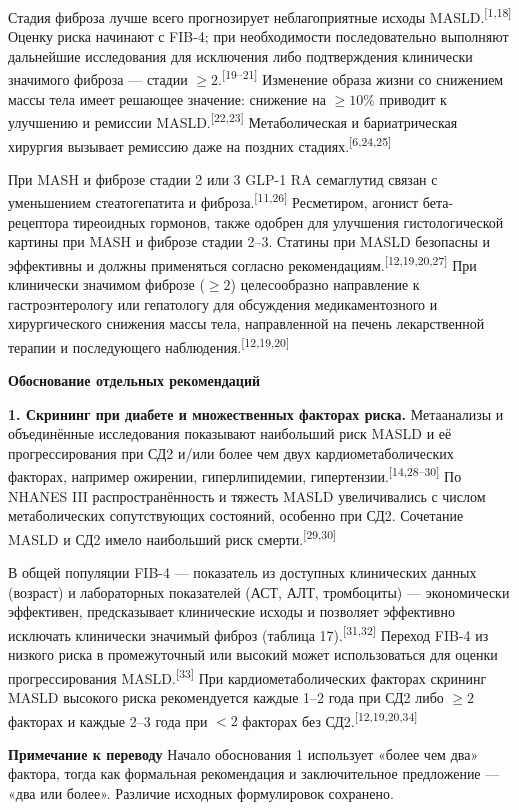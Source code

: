 \documentclass[11pt,a4paper]{article}
\newcommand{\src}[1]{\textsuperscript{[#1]}}
\newcommand{\editorial}[1]{\par\begingroup\small\color{black!70}\textbf{Примечание к переводу} #1\par\endgroup}
\newcommand{\heading}[1]{\par\medskip\textbf{#1}\par}
\begin{document}
Стадия фиброза лучше всего прогнозирует неблагоприятные исходы MASLD.\src{1,18} Оценку риска начинают с FIB-4; при необходимости последовательно выполняют дальнейшие исследования для исключения либо подтверждения клинически значимого фиброза --- стадии $\geq2$.\src{19--21} Изменение образа жизни со снижением массы тела имеет решающее значение: снижение на $\geq10\%$ приводит к улучшению и ремиссии MASLD.\src{22,23} Метаболическая и бариатрическая хирургия вызывает ремиссию даже на поздних стадиях.\src{6,24,25}

При MASH и фиброзе стадии 2 или 3 GLP-1 RA семаглутид связан с уменьшением стеатогепатита и фиброза.\src{11,26} Ресметиром, агонист бета-рецептора тиреоидных гормонов, также одобрен для улучшения гистологической картины при MASH и фиброзе стадии 2--3. Статины при MASLD безопасны и эффективны и должны применяться согласно рекомендациям.\src{12,19,20,27} При клинически значимом фиброзе ($\geq2$) целесообразно направление к гастроэнтерологу или гепатологу для обсуждения медикаментозного и хирургического снижения массы тела, направленной на печень лекарственной терапии и последующего наблюдения.\src{12,19,20}

\heading{Обоснование отдельных рекомендаций}
\textbf{1. Скрининг при диабете и множественных факторах риска.} Метаанализы и объединённые исследования показывают наибольший риск MASLD и её прогрессирования при СД2 и/или более чем двух кардиометаболических факторах, например ожирении, гиперлипидемии, гипертензии.\src{14,28--30} По NHANES III распространённость и тяжесть MASLD увеличивались с числом метаболических сопутствующих состояний, особенно при СД2. Сочетание MASLD и СД2 имело наибольший риск смерти.\src{29,30}

В общей популяции FIB-4 --- показатель из доступных клинических данных (возраст) и лабораторных показателей (АСТ, АЛТ, тромбоциты) --- экономически эффективен, предсказывает клинические исходы и позволяет эффективно исключать клинически значимый фиброз (таблица 17).\src{31,32} Переход FIB-4 из низкого риска в промежуточный или высокий может использоваться для оценки прогрессирования MASLD.\src{33} При кардиометаболических факторах скрининг MASLD высокого риска рекомендуется каждые 1--2 года при СД2 либо $\geq2$ факторах и каждые 2--3 года при $<2$ факторах без СД2.\src{12,19,20,34}
\editorial{Начало обоснования 1 использует «более чем два» фактора, тогда как формальная рекомендация и заключительное предложение --- «два или более». Различие исходных формулировок сохранено.}
\end{document}
